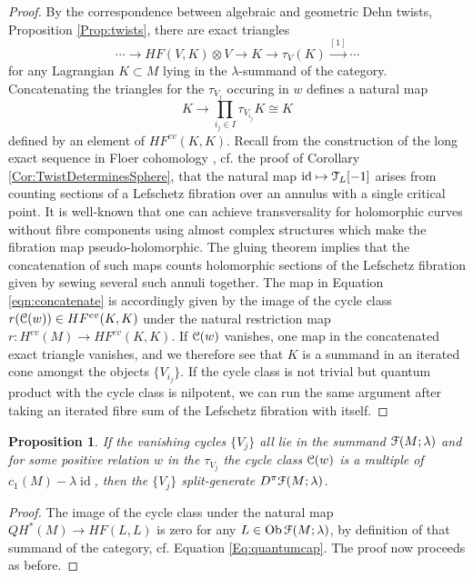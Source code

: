 \documentclass[reqno,10pt]{amsart}
\numberwithin{equation}{section}
\newcommand{\scrC}{\EuScript{C}}
\newcommand{\scrT}{\EuScript{T}}
\newcommand{\scrF}{\EuScript{F}}
\newcommand{\id}{\operatorname{id}}
\newtheorem{Proposition}[thm]{Proposition}
\theoremstyle{remark}
\begin{document}
\begin{proof}
By the correspondence between algebraic and geometric Dehn twists, Proposition \ref{Prop:twists}, there are exact triangles
\[
\cdots \rightarrow  HF(V,K)\otimes V \rightarrow K \rightarrow \tau_V(K) \stackrel{[1]}{\longrightarrow} \cdots
\]
for any Lagrangian $K \subset M$ lying in the $\lambda$-summand of the category.  Concatenating the triangles for the $\tau_{V_j}$ occuring in $w$ defines a natural map
\begin{equation}\label{eqn:concatenate}
K \rightarrow \prod_{i_j\in I} \tau_{V_{i_j}} K \cong K
\end{equation}
defined by an element of $HF^{ev}(K,K)$.  Recall from  the construction of the long exact sequence in Floer cohomology \cite{Seidel:triangle}, cf. the proof of Corollary \ref{Cor:TwistDeterminesSphere}, that the natural map $\id \mapsto \scrT_L[-1]$ arises from counting sections of a Lefschetz fibration over an annulus with a single critical point.  It is well-known that one can achieve transversality for holomorphic curves without fibre components using almost complex structures which make the fibration map pseudo-holomorphic.  The gluing theorem \cite[Proposition 2.22]{Seidel:triangle} implies that the concatenation of such maps counts holomorphic sections of the Lefschetz fibration given by sewing several such annuli together.  The map in  Equation \ref{eqn:concatenate} is accordingly given by the image of  the cycle class $r(\scrC(w)) \in HF^{ev}(K,K)$ under the natural restriction map $r: H^{ev}(M) \rightarrow HF^{ev}(K,K)$.  If $\scrC(w)$ vanishes, one map in the concatenated exact triangle vanishes, and we therefore see that $K$ is a summand in an iterated cone amongst the objects $\{V_{i_j}\}$.  If the cycle class is not trivial but quantum product with the cycle class is nilpotent, we can run the same argument after taking an iterated fibre sum of the Lefschetz fibration with itself. 
\end{proof}

\begin{Proposition} \label{Prop:Split-Generate}
If  the vanishing cycles $\{V_j\}$ all lie in the  summand $\scrF(M;\lambda)$ and for some positive relation $w$ in the $\tau_{V_j}$ the cycle class $\scrC(w)$ is a multiple of $c_1(M)-\lambda\id$, then the $\{V_j\}$ split-generate $D^{\pi}\scrF(M;\lambda)$.
\end{Proposition}

\begin{proof}
The image of the cycle class under the natural map $QH^*(M) \rightarrow HF(L,L)$ is zero for any $L \in \textrm{Ob} \, \scrF(M;\lambda)$, by definition of that summand of the category, cf. Equation \ref{Eq:quantumcap}.  The proof now proceeds as before.
\end{proof}
\end{document}
